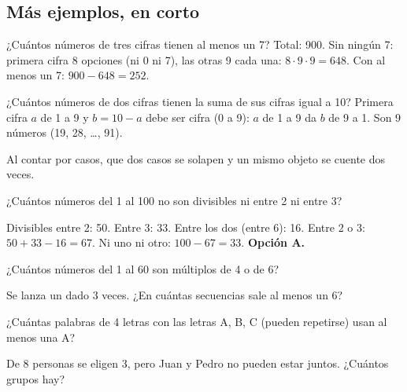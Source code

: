 \subsection{Más ejemplos, en corto}
\begin{ejemplo}[Al menos un 7]
¿Cuántos números de tres cifras tienen al menos un 7?
\solucion Total: 900. Sin ningún 7: primera cifra 8 opciones (ni 0 ni 7), las otras 9 cada una: $8 \cdot 9 \cdot 9 =
648$. Con al menos un 7: $900 - 648 = 252$.
\end{ejemplo}

\begin{ejemplo}
¿Cuántos números de dos cifras tienen la suma de sus cifras igual a 10?
\solucion Primera cifra $a$ de 1 a 9 y $b = 10 - a$ debe ser cifra (0 a 9): $a$ de 1 a 9 da $b$ de 9 a 1. Son 9 números
(19, 28, …, 91).
\end{ejemplo}

\begin{trampa}
Al contar por casos, que dos casos se solapen y un mismo objeto se cuente dos veces.
\end{trampa}

\begin{reto}
¿Cuántos números del 1 al 100 no son divisibles ni entre 2 ni entre 3?
\end{reto}

\begin{retoresuelto}
Divisibles entre 2: 50. Entre 3: 33. Entre los dos (entre 6): 16. Entre 2 o 3: $50 + 33 - 16 = 67$. Ni uno ni otro:
$100 - 67 = 33$. \textbf{Opción A.}
\end{retoresuelto}

\taller
{}
\begin{ejercicios}
\item ¿Cuántos números del 1 al 60 son múltiplos de 4 o de 6? 
\item Se lanza un dado 3 veces. ¿En cuántas secuencias sale al menos un 6? 
\end{ejercicios}
\begin{ejercicios}
\item ¿Cuántas palabras de 4 letras con las letras A, B, C (pueden repetirse) usan al menos una A?
\item De 8 personas se eligen 3, pero Juan y Pedro no pueden estar juntos. ¿Cuántos grupos hay?
\end{ejercicios}

